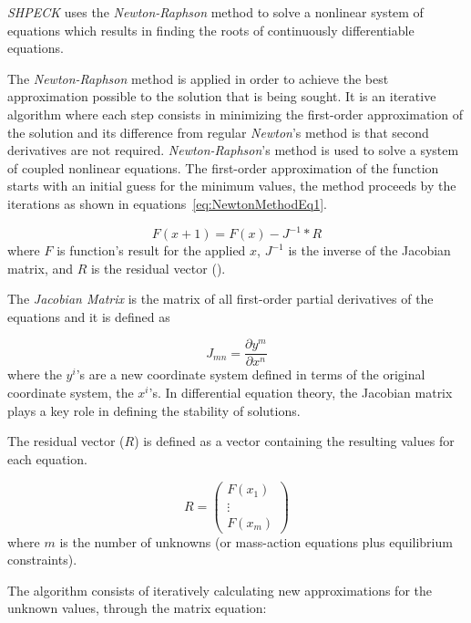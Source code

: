 \emph{SHPECK} uses the \emph{Newton-Raphson} method to solve a nonlinear system of equations which results in finding the roots of continuously differentiable equations. 

The \emph{Newton-Raphson} method is applied in order to achieve the best approximation possible to the solution that is being sought. It is an iterative algorithm where each step consists in minimizing the first-order approximation of the solution and its difference from regular \emph{Newton}'s method is that second derivatives are not required. \emph{Newton-Raphson}'s method is used to solve a system of coupled nonlinear equations. The first-order approximation of the function starts with an initial guess for the minimum values, the method proceeds by the iterations as shown in equations~\ref{eq:NewtonMethodEq1}.

\begin{equation}
\label{eq:NewtonMethodEq1}
F(x+1) = F(x) - J^{-1} * R
\end{equation}
where $F$ is function's result for the applied $x$, $J^{-1}$ is the inverse of the Jacobian matrix, and $R$ is the residual vector (\cite{Isaacson:66}).

The \emph{Jacobian Matrix} is the matrix of all first-order partial derivatives of the equations and it is defined as

\begin{equation}
\label{eq:JacobianDefinition}
J_{mn} = \frac{\partial y^m}{\partial x^n}
\end{equation}
where the $y^i$'s are a new coordinate system defined in terms of the original coordinate system, the $x^i$'s. In differential equation theory, the Jacobian matrix plays a key role in defining the stability of solutions.

The residual vector ($R$) is defined as a vector containing the resulting values for each equation.

\begin{equation}
\label{eq:residualVector}
R = \begin{pmatrix}
 F(x_1) \\
 \vdots \\
 F(x_m)
 \end{pmatrix}
\end{equation}
where $m$ is the number of unknowns (or mass-action equations plus equilibrium constraints).

The algorithm consists of iteratively calculating new approximations for the unknown values, through the matrix equation:

